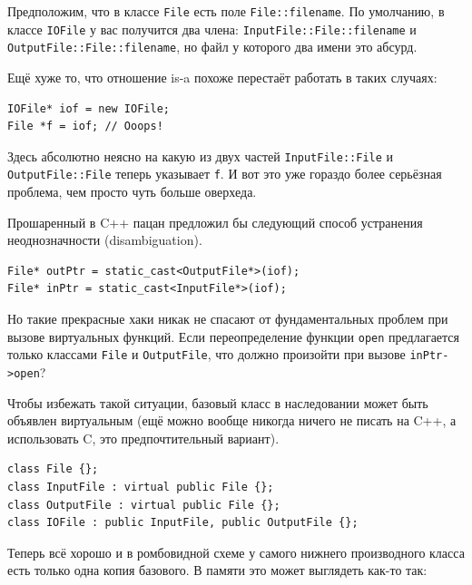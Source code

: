 \documentclass[a4paper,12pt,oneside]{book}
\begin{document}
Предположим, что в классе \lstinline!File! есть поле \lstinline!File::filename!. По умолчанию, в классе \lstinline!IOFile! у вас получится два члена: \lstinline!InputFile::File::filename! и \lstinline!OutputFile::File::filename!, но файл у которого два имени это абсурд. 

Ещё хуже то, что отношение is-a похоже перестаёт работать в таких случаях:

\begin{lstlisting}
IOFile* iof = new IOFile;
File *f = iof; // Ooops!
\end{lstlisting}

Здесь абсолютно неясно на какую из двух частей \lstinline!InputFile::File! и \lstinline!OutputFile::File! теперь указывает \lstinline!f!. И вот это уже гораздо более серьёзная проблема, чем просто чуть больше оверхеда.

Прошаренный в C++ пацан предложил бы следующий способ устранения неоднозначности (disambiguation).

\begin{lstlisting}
File* outPtr = static_cast<OutputFile*>(iof);
File* inPtr = static_cast<InputFile*>(iof);
\end{lstlisting}

Но такие прекрасные хаки никак не спасают от фундаментальных проблем при вызове виртуальных функций. Если переопределение функции \lstinline!open! предлагается только классами \lstinline!File! и \lstinline!OutputFile!, что должно произойти при вызове \lstinline!inPtr->open!?

Чтобы избежать такой ситуации, базовый класс в наследовании может быть объявлен виртуальным (ещё можно вообще никогда ничего не писать на C++, а использовать C, это предпочтительный вариант).

\begin{lstlisting}
class File {};
class InputFile : virtual public File {};
class OutputFile : virtual public File {};
class IOFile : public InputFile, public OutputFile {};
\end{lstlisting}

Теперь всё хорошо и в ромбовидной схеме у самого нижнего производного класса есть только одна копия базового. В памяти это может выглядеть как-то так:
\end{document}
